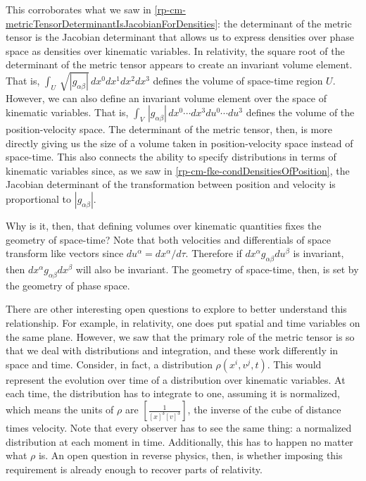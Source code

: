 This corroborates what we saw in \ref{rp-cm-metricTensorDeterminantIsJacobianForDensities}: the determinant of the metric tensor is the Jacobian determinant that allows us to express densities over phase space as densities over kinematic variables. In relativity, the square root of the determinant of the metric tensor appears to create an invariant volume element. That is, $\int_U \, \sqrt{|g_{\alpha\beta}|} \, dx^0 dx^1 dx^2 dx^3$ defines the volume of space-time region $U$. However, we can also define an invariant volume element over the space of kinematic variables. That is, $\int_V \, |g_{\alpha\beta}| \, dx^0 \cdots dx^3 du^0 \cdots du^3$ defines the volume of the position-velocity space. The determinant of the metric tensor, then, is more directly giving us the size of a volume taken in position-velocity space instead of space-time. This also connects the ability to specify distributions in terms of kinematic variables since, as we saw in \ref{rp-cm-fke-condDensitiesOfPosition}, the Jacobian determinant of the transformation between position and velocity is proportional to $|g_{\alpha\beta}|$.

Why is it, then, that defining volumes over kinematic quantities fixes the geometry of space-time? Note that both velocities and differentials of space transform like vectors since $du^\alpha = dx^\alpha / d\tau$. Therefore if $dx^\alpha g_{\alpha\beta} du^\beta$ is invariant, then $dx^\alpha g_{\alpha\beta} dx^\beta$ will also be invariant. The geometry of space-time, then, is set by the geometry of phase space.

There are other interesting open questions to explore to better understand this relationship. For example, in relativity, one does put spatial and time variables on the same plane. However, we saw that the primary role of the metric tensor is so that we deal with distributions and integration, and these work differently in space and time. Consider, in fact, a distribution $\rho(x^i, v^j, t)$. This would represent the evolution over time of a distribution over kinematic variables. At each time, the distribution has to integrate to one, assuming it is normalized, which means the units of $\rho$ are $\left[\frac{1}{[x]^3[v]^3}\right]$, the inverse of the cube of distance times velocity. Note that every observer has to see the same thing: a normalized distribution at each moment in time. Additionally, this has to happen no matter what $\rho$ is. An open question in reverse physics, then, is whether imposing this requirement is already enough to recover parts of relativity.

